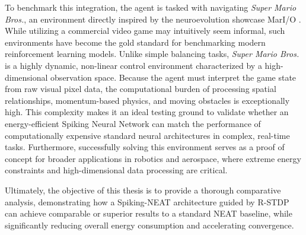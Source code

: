 To benchmark this integration, the agent is tasked with navigating \textit{Super Mario Bros.}, an environment directly inspired by the neuroevolution showcase MarI/O \cite{sethbling2015mario}. While utilizing a commercial video game may intuitively seem informal, such environments have become the gold standard for benchmarking modern reinforcement learning models. Unlike simple balancing tasks, \textit{Super Mario Bros.} is a highly dynamic, non-linear control environment characterized by a high-dimensional observation space. Because the agent must interpret the game state from raw visual pixel data, the computational burden of processing spatial relationships, momentum-based physics, and moving obstacles is exceptionally high. This complexity makes it an ideal testing ground to validate whether an energy-efficient Spiking Neural Network can match the performance of computationally expensive standard neural architectures in complex, real-time tasks. Furthermore, successfully solving this environment serves as a proof of concept for broader applications in robotics and aerospace, where extreme energy constraints and high-dimensional data processing are critical.

Ultimately, the objective of this thesis is to provide a thorough comparative analysis, demonstrating how a Spiking-NEAT architecture guided by R-STDP can achieve comparable or superior results to a standard NEAT baseline, while significantly reducing overall energy consumption and accelerating convergence.